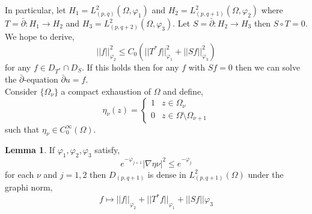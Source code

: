 \documentclass[12pt]{extarticle}
\theoremstyle{definition}
\newtheorem{lemma}[theorem]{Lemma}
\begin{document}
In particular, let $H_1 = L^2_{(p,q)}(\Omega, \varphi_1)$ and $H_2 = L^2_{(p, q+1)}(\Omega, \varphi_2)$ where $T = \bar{\partial} : H_1 \to H_2$ and $H_3 = L^2_{(p, q+2)}(\Omega, \varphi_3)$. Let $S = \bar{\partial} : H_2 \to H_3$ then $S \circ T = 0$. We hope to derive,
\[ || f||_{\varphi_2}^2 \le C_0 \left( ||T^* f ||_{\varphi_1}^2 + || Sf ||_{\varphi_3}^2 \right) \]
for any $f \in D_{T^*} \cap D_S$.
If this holds then for any $f$ with $S f = 0$ then we can solve the $\bar{\partial}$-equation $\bar{\partial} u = f$. 
\bigskip\\
Consider $\{ \Omega_\nu \}$ a compact exhaustion of $\Omega$ and define,
\[ \eta_\nu(z) = \begin{cases}
1 & z \in \Omega_\nu 
\\
0 & z \in \Omega \setminus \Omega_{\nu+1} 
\end{cases} \]
such that $\eta_\nu \in C_0^\infty(\Omega)$. 

\begin{lemma}
If $\varphi_1, \varphi_2, \varphi_3$ satisfy,
\[ e^{-\varphi_{j+1}} | \nabla \eta\nu |^2 \le e^{-\varphi_j} \]
for each $\nu$ and $j = 1,2$ then $D_{(p,q+1)}$ is dense in $L^2_{(p,q+1)}(\Omega)$ under the graphi norm,
\[ f \mapsto || f ||_{\varphi_2} + || T^* f ||_{\varphi_1} + || S f ||{\varphi_3} \]
\end{lemma}
\end{document}
